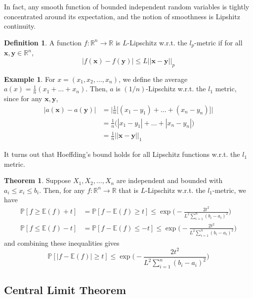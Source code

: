 \documentclass{article}
\theoremstyle{definition}
\newtheorem{theorem}{Theorem}[section]
\newtheorem{example}{Example}[section]
\theoremstyle{remark}
\theoremstyle{definition}
\newtheorem{definition}{Definition}[section]
\begin{document}
In fact, any smooth function of bounded independent random variables is tightly concentrated around its expectation, and the notion of smoothness is Lipshitz continuity. 

\begin{definition}
A function $f: \mathbb{R}^n \longrightarrow \mathbb{R}$ is $L$-Lipschitz w.r.t. the $l_p$-metric if for all $\mathbf{x}, \mathbf{y} \in \mathbb{R}^n$, 
\[|f(\mathbf{x}) - f(\mathbf{y})| \leq L ||\mathbf{x} - \mathbf{y}||_p\]
\end{definition}

\begin{example}
For $x = (x_1, x_2, \ldots, x_n)$, we define the average $a(x) = \frac{1}{n} (x_1 + \ldots + x_n)$. Then, $a$ is $(1/n)$-Lipschitz w.r.t. the $l_1$ metric, since for any $\mathbf{x}, \mathbf{y}$, 
\begin{align*}
    |a(\mathbf{x}) - a(\mathbf{y})| & = \bigg| \frac{1}{n} \big[ (x_1 - y_1) + \ldots + (x_n - y_n) \big] \bigg| \\
    & = \frac{1}{n} \big( |x_1 - y_1| + \ldots + |x_n - y_n| \big) \\
    & = \frac{1}{n} ||\mathbf{x} - \mathbf{y} ||_1
\end{align*}
\end{example}

It turns out that Hoeffding's bound holds for all Lipschitz functions w.r.t. the $l_1$ metric. 

\begin{theorem}
Suppose $X_1, X_2, \ldots, X_n$ are independent and bounded with $a_i \leq x_i \leq b_i$. Then, for any $f: \mathbb{R}^n \longrightarrow \mathbb{R}$ that is $L$-Lipschitz w.r.t. the $l_1$-metric, we have 
\begin{align*}
    \mathbb{P} [ f \geq \mathbb{E}(f) + t] & = \mathbb{P} [ f - \mathbb{E}(f) \geq t] \leq \exp\bigg(- \frac{2 t^2}{L^2 \sum_{i=1}^n (b_i - a_i)^2} \bigg) \\
    \mathbb{P} [ f \leq \mathbb{E}(f) - t] & = \mathbb{P} [ f - \mathbb{E}(f) \leq -t] \leq \exp\bigg(- \frac{2 t^2}{L^2 \sum_{i=1}^n (b_i - a_i)^2} \bigg)
\end{align*}
and combining these inequalities gives 
\[\mathbb{P} [ |f - \mathbb{E}(f)| \geq t] \leq \exp\bigg(- \frac{2 t^2}{L^2 \sum_{i=1}^n (b_i - a_i)^2} \bigg)\]
\end{theorem}

\subsection{Central Limit Theorem}
\end{document}
